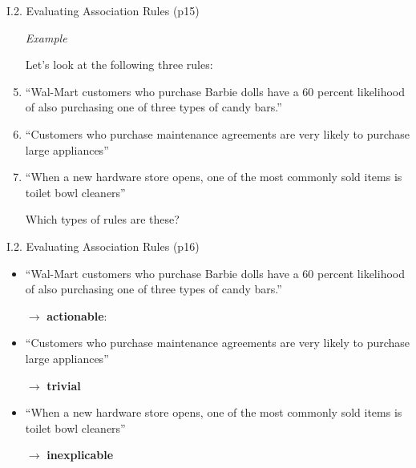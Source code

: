 \documentclass[handout]{beamer}
\newcommand{\strong}[1]{\textbf{\color{teal} #1}}
\begin{document}
\begin{frame}{I.2. Evaluating Association Rules (p15)}
\begin{enumerate}
\item[] \emph{Example}~\cite[ch 15, referencing Forbes 8/9/1997]{LB3:2011}

\item[]
\item[] Let's look at the following three rules:
\item[]
\item ``Wal-Mart customers who purchase Barbie dolls have a 60 percent likelihood of also purchasing one of three types of candy bars.''
\item ``Customers who purchase maintenance agreements are very likely to purchase large appliances''
\item ``When a new hardware store opens, one of the most commonly sold items is toilet bowl cleaners''
\item[]
\item[] Which types of rules are these?
\end{enumerate}
\end{frame}
\begin{frame}{I.2. Evaluating Association Rules (p16)}
\begin{itemize}
\item ``Wal-Mart customers who purchase Barbie dolls have a 60 percent likelihood of also purchasing one of three types of candy bars.''
\item[$\rightarrow$] \strong{actionable}:
\item[]
\item ``Customers who purchase maintenance agreements are very likely to purchase large appliances''
\item[$\rightarrow$] \strong{trivial}
\item[]
\item ``When a new hardware store opens, one of the most commonly sold items is toilet bowl cleaners''
\item[$\rightarrow$] \strong{inexplicable}
\end{itemize}
\end{frame}
\end{document}

